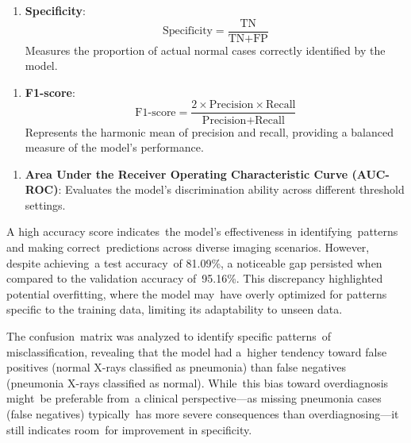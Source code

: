 \documentclass[
  twocolumn,
  10pt,
  a4paper,
  journal
]{IEEEtran}
\begin{document}
\begin{enumerate}
\def\labelenumi{\arabic{enumi}.}
\setcounter{enumi}{2}
\item
  \textbf{Specificity}: 
  \begin{equation}
  \text{Specificity} = \frac{\text{TN}}{\text{TN} + \text{FP}}
  \end{equation}
  Measures the proportion of actual normal cases correctly identified by the model.
\end{enumerate}

\begin{enumerate}
\def\labelenumi{\arabic{enumi}.}
\setcounter{enumi}{3}
\item
  \textbf{F1-score}: 
  \begin{equation}
  \text{F1-score} = \frac{2 \times \text{Precision} \times \text{Recall}}{\text{Precision} + \text{Recall}}
  \end{equation}
  Represents the harmonic mean of precision and recall, providing a balanced measure of the model's performance.
\end{enumerate}

\begin{enumerate}
\def\labelenumi{\arabic{enumi}.}
\setcounter{enumi}{4}
\item
  \textbf{Area Under the Receiver Operating Characteristic Curve (AUC-ROC)}:
  Evaluates the model's discrimination ability across different threshold settings.
\end{enumerate}

A high accuracy score indicates~the model's
effectiveness in identifying~patterns and making correct~predictions
across diverse imaging scenarios. However, despite achieving~a test
accuracy~of 81.09\%, a noticeable gap persisted when compared to the
validation accuracy of~95.16\%. This discrepancy highlighted potential
overfitting, where the model may~have overly optimized for patterns
specific to the training data, limiting its adaptability to unseen data.

The confusion~matrix was analyzed to identify specific patterns~of
misclassification, revealing that the model had a~higher tendency toward
false positives (normal X-rays classified as pneumonia) than false
negatives (pneumonia X-rays classified as normal). While~this bias
toward overdiagnosis might~be preferable from~a clinical
perspective---as missing pneumonia cases (false negatives) typically~has
more severe consequences than overdiagnosing---it still indicates
room~for improvement in specificity.
\end{document}
